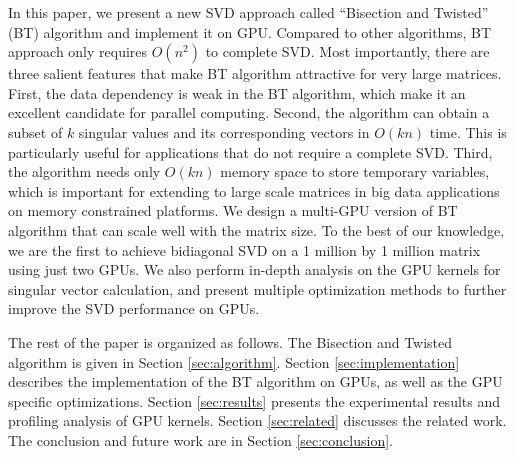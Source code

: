In this paper, we present a new SVD approach called ``Bisection and Twisted'' (BT) algorithm and implement it on GPU. 
Compared to other algorithms, BT approach only requires $O(n^2)$ to complete SVD\cite{05UCB,09NLAAtwisted}.
Most importantly, there are three salient features that make BT algorithm attractive for very large matrices. 
First, the data dependency is weak in the BT algorithm, which make it an excellent candidate for parallel computing. 
Second, the algorithm can obtain a subset of $k$ singular values and its corresponding vectors in $O(kn)$ time. 
This is particularly useful for applications that do not require a complete SVD.
Third, the algorithm needs only $O(kn)$ memory space to store temporary variables, which is important for extending to large scale matrices in big data applications on memory constrained platforms.
We design a multi-GPU version of BT algorithm that can scale well with the matrix size. To the best of our knowledge, we are the first to achieve bidiagonal SVD on a 1 million by 1 million matrix using just two GPUs.
We also perform in-depth analysis on the GPU kernels for singular vector calculation, and present multiple optimization methods to further improve the SVD performance on GPUs.

The rest of the paper is organized as follows.
The Bisection and Twisted algorithm is given in Section \ref{sec:algorithm}.
Section \ref{sec:implementation} describes the implementation of the BT algorithm on GPUs, as well as the GPU specific optimizations.
Section \ref{sec:results} presents the experimental results and profiling analysis of GPU kernels.
Section \ref{sec:related} discusses the related work.
The conclusion and future work are in Section \ref{sec:conclusion}.


